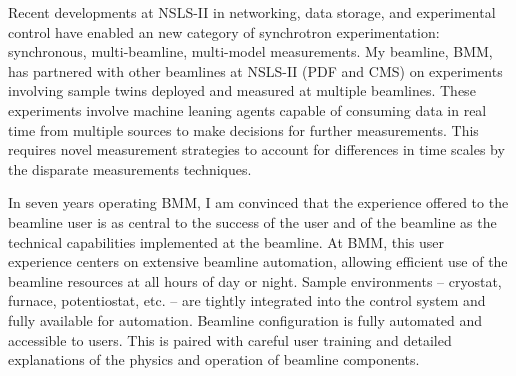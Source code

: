 \documentclass[11pt]{moderncv}
\begin{document}
%
{Recent developments at NSLS-II in networking, data storage, and
  experimental control have enabled an new category of synchrotron
  experimentation: synchronous, multi-beamline, multi-model
  measurements.  My beamline, BMM, has partnered with other beamlines
  at NSLS-II (PDF and CMS) on experiments involving sample twins
  deployed and measured at multiple beamlines. These experiments
  involve machine leaning agents capable of consuming data in real
  time from multiple sources to make decisions for further
  measurements.  This requires novel measurement strategies to account
  for differences in time scales by the disparate measurements
  techniques.}

%
%
{In seven years operating BMM, I am convinced that the experience
  offered to the beamline user is as central to the success of the
  user and of the beamline as the technical capabilities implemented
  at the beamline.  At BMM, this user experience centers on extensive
  beamline automation, allowing efficient use of the beamline
  resources at all hours of day or night.  Sample environments --
  cryostat, furnace, potentiostat, etc. -- are tightly integrated into
  the control system and fully available for automation.  Beamline
  configuration is fully automated and accessible to users.  This is
  paired with careful user training and detailed explanations of the
  physics and operation of beamline components.
}
\end{document}
